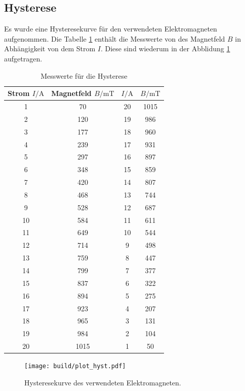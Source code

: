 \subsection{Hysterese}
Es wurde eine Hysteresekurve für den verwendeten Elektromagneten aufgenommen.
Die Tabelle \ref{tab:hyst} enthält die Messwerte von des Magnetfeld $B$
in Abhängigkeit von dem  Strom $I$. Diese sind wiederum
in der Abblidung \ref{fig:hyst} aufgetragen.
\begin{table}
  \centering
  \caption{Messwerte für die Hysterese}
  \label{tab:hyst}
\begin{tabular}{c c | c c}
  \toprule
 Strom $I/\si{\ampere}$  & Magnetfeld $B/\si{\milli\tesla}$  & $I/\si{\ampere}$ & $B/\si{\milli\tesla}$ \\
  \midrule
  1   &  70  &  20  &  1015 \\
  2   &  120 &  19  &   986 \\
  3   &  177 &  18  &   960 \\
  4   &  239 &  17  &   931 \\
  5   &  297 &  16  &   897 \\
  6   &  348 &  15  &   859 \\
  7   &  420 &  14  &   807 \\
  8   &  468 &  13  &   744 \\
  9   &  528 &  12  &   687 \\
  10  &  584 &  11  &   611 \\
  11  &  649 &  10  &   544 \\
  12  &  714 &   9  &   498 \\
  13  &  759 &  8   &   447 \\
  14  &  799 &  7   &   377 \\
  15  &  837 &  6   &   322 \\
  16  &  894 &  5   &   275 \\
  17  &  923 &  4   &   207 \\
  18  &  965 &  3   &   131 \\
  19  &  984 &  2   &   104 \\
  20  &  1015 &  1   &    50 \\
  \bottomrule
\end{tabular}
\end{table}


\begin{figure}
   \centering
   \texttt{[image: build/plot\_hyst.pdf]}
   \caption{Hysteresekurve des verwendeten Elektromagneten.}
   \label{fig:hyst}
 \end{figure}


